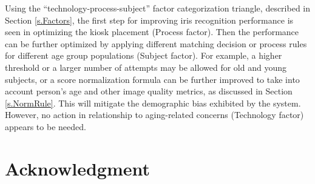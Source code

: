 \documentclass{cta-author}%
\newcommand{\cmt}[1]{}
\begin{document}
Using the ``technology-process-subject'' factor categorization triangle, described in Section \ref{s.Factors}, 
the first 
step for improving iris recognition performance is seen in optimizing the kiosk placement (Process factor). 
Then the performance can be further optimized by applying different matching decision or process rules for different age group populations (Subject factor). 
For example, 
a higher threshold or a larger number of attempts may be allowed for old and young subjects,
or  a score normalization formula can be further improved to take into account person's age and other image quality metrics, as discussed in Section \ref{s.NormRule}. This will mitigate the demographic bias exhibited by the system.
However, no action in relationship to aging-related concerns (Technology factor) appears to be needed.


\cmt{
Then the performance can be further optimized by applying different matching decision or process rules for different age group populations, e.g., 
a higher threshold or a larger number of attempts for old and young subjects,
or matching score normalization formula can be further improved, as mentioned in this paper, to take into account person's age and other image quality metrics (Subject factor).
}




\section*{Acknowledgment}
\end{document}
